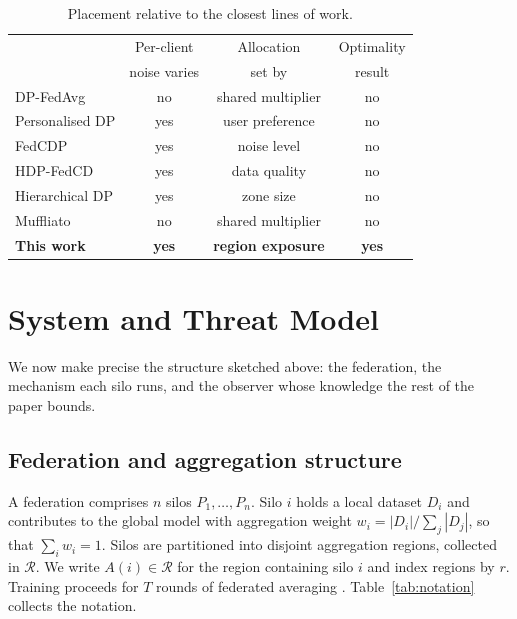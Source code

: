 \documentclass[acmsmall,screen,review,anonymous]{acmart}
\theoremstyle{acmdefinition}%
\newcommand{\Reg}{\mathcal{R}}
\begin{document}
\begin{table}[t]
\caption{Placement relative to the closest lines of work.}
\label{tab:related}
\centering
\footnotesize
\setlength{\tabcolsep}{3.5pt}
\begin{tabular}{@{}lccc@{}}
\toprule
& Per-client & Allocation & Optimality \\
& noise varies & set by & result \\
\midrule
DP-FedAvg \cite{mcmahan2018dprnn}      & no  & shared multiplier   & no \\
Personalised DP \cite{jorgensen2015personalized} & yes & user preference & no \\
FedCDP \cite{guo2025fedcdp}            & yes & noise level         & no \\
HDP-FedCD \cite{yin2026hdpfedcd}       & yes & data quality        & no \\
Hierarchical DP \cite{chandrasekaran2022hfl} & yes & zone size     & no \\
Muffliato \cite{cyffers2022muffliato}  & no  & shared multiplier   & no \\
\textbf{This work}                     & \textbf{yes} & \textbf{region exposure} & \textbf{yes} \\
\bottomrule
\end{tabular}
\end{table}

\section{System and Threat Model}
\label{sec:model}

We now make precise the structure sketched above: the federation, the mechanism
each silo runs, and the observer whose knowledge the rest of the paper bounds.

\subsection{Federation and aggregation structure}

A federation comprises $n$ silos $P_1, \dots, P_n$. Silo $i$ holds a local dataset
$D_i$ and contributes to the global model with aggregation weight $w_i = |D_i| /
\sum_j |D_j|$, so that $\sum_i w_i = 1$. Silos are partitioned into disjoint
aggregation regions, collected in $\Reg$. We write $A(i) \in \Reg$ for the region
containing silo $i$ and index regions by $r$. Training proceeds for $T$ rounds of
federated averaging \cite{mcmahan2017fedavg}. Table~\ref{tab:notation} collects
the notation.
\end{document}
